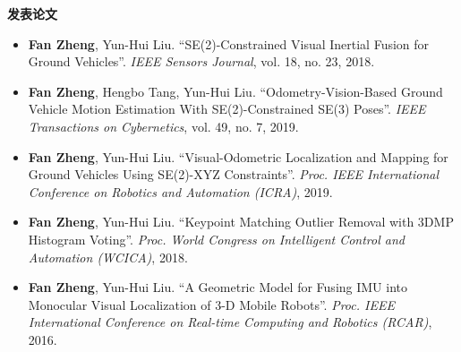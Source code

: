 \documentclass[11pt]{article}
\newcommand{\subsec}[1]{
  \vskip 4pt
  {\bf\large\color{teal}  #1}
  \vskip 1pt
}
\begin{document}
\begin{minipage}[t]{0.6\textwidth}
  \subsec{发表论文}

  \begin{itemize}
    \item {\bf Fan Zheng}, Yun-Hui Liu. ``SE(2)-Constrained Visual Inertial Fusion for Ground Vehicles''. {\it IEEE Sensors Journal}, vol. 18, no. 23, 2018.
    \item {\bf Fan Zheng}, Hengbo Tang, Yun-Hui Liu. ``Odometry-Vision-Based Ground Vehicle Motion Estimation With SE(2)-Constrained SE(3) Poses''. {\it IEEE Transactions on Cybernetics}, vol. 49, no. 7, 2019.
    \item {\bf Fan Zheng}, Yun-Hui Liu. ``Visual-Odometric Localization and Mapping for Ground Vehicles Using SE(2)-XYZ Constraints''. {\it Proc. IEEE International Conference on Robotics and Automation (ICRA)}, 2019.
    \item {\bf Fan Zheng}, Yun-Hui Liu. ``Keypoint Matching Outlier Removal with 3DMP Histogram Voting''. {\it Proc. World Congress on Intelligent Control and Automation (WCICA)}, 2018.
    \item {\bf Fan Zheng}, Yun-Hui Liu. ``A Geometric Model for Fusing IMU into Monocular Visual Localization of 3-D Mobile Robots''. {\it Proc. IEEE International Conference on Real-time Computing and Robotics (RCAR)}, 2016.
  \end{itemize}

\end{minipage}
\hfill\begingroup\color{teal}\vrule width 1pt\endgroup\hfill
\noindent
\end{document}
